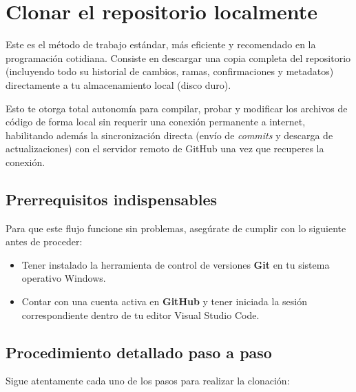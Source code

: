 \documentclass[
10pt, %
a4paper, %
oneside, %
headinclude,footinclude, %
BCOR5mm, %
]{scrartcl}
\begin{document}
\section{Clonar el repositorio localmente}

Este es el método de trabajo estándar, más eficiente y recomendado en la programación cotidiana. Consiste en descargar una copia completa del repositorio (incluyendo todo su historial de cambios, ramas, confirmaciones y metadatos) directamente a tu almacenamiento local (disco duro). 

Esto te otorga total autonomía para compilar, probar y modificar los archivos de código de forma local sin requerir una conexión permanente a internet, habilitando además la sincronización directa (envío de \textit{commits} y descarga de actualizaciones) con el servidor remoto de GitHub una vez que recuperes la conexión.

\subsection{Prerrequisitos indispensables}
Para que este flujo funcione sin problemas, asegúrate de cumplir con lo siguiente antes de proceder:
\begin{itemize}
	\item Tener instalado la herramienta de control de versiones \textbf{Git} en tu sistema operativo Windows.
	\item Contar con una cuenta activa en \textbf{GitHub} y tener iniciada la sesión correspondiente dentro de tu editor Visual Studio Code.
\end{itemize}

\subsection{Procedimiento detallado paso a paso}

Sigue atentamente cada uno de los pasos para realizar la clonación:
\end{document}
